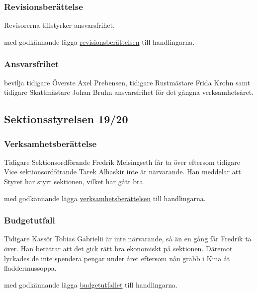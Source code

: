 \documentclass[hidelinks]{../sektionsmote} %
\begin{document}
\subsubsection{Revisionsberättelse}
Revisorerna tillstyrker ansvarsfrihet.
\begin{beslut}
    \item med godkännande lägga \hyperlink{bilagor/dp/rb.pdf.1}{revisionsberättelsen} till handlingarna.
\end{beslut}

\subsubsection{Ansvarsfrihet}
\begin{beslut}
    \item bevilja tidigare Överste Axel Prebensen, tidigare Rustmästare Frida Krohn samt tidigare Skattmästare Johan Bruhn ansvarsfrihet för det gångna verksamhetsåret.
\end{beslut}

\subsection{Sektionsstyrelsen 19/20}

\subsubsection{Verksamhetsberättelse}
Tidigare Sektionsordförande Fredrik Meisingseth får ta över eftersom tidigare Vice sektionsordförande Tarek Alhaskir inte är närvarande.
Han meddelar att Styret har styrt sektionen, vilket har gått bra.
\begin{beslut}
    \item med godkännande lägga \hyperlink{bilagor/styret/vb.pdf.1}{verksamhetsberättelsen} till handlingarna.
\end{beslut}

\subsubsection{Budgetutfall}
Tidigare Kassör Tobias Gabrielii är inte närvarande, så än en gång får Fredrik ta över.
Han berättar att det gick rätt bra ekonomiskt på sektionen.
Däremot lyckades de inte spendera pengar under året eftersom nån grabb i Kina åt fladdermussoppa.
\begin{beslut}
    \item med godkännande lägga \hyperlink{bilagor/styret/budgetutfall.pdf.1}{budgetutfallet} till handlingarna.
\end{beslut}
\end{document}

